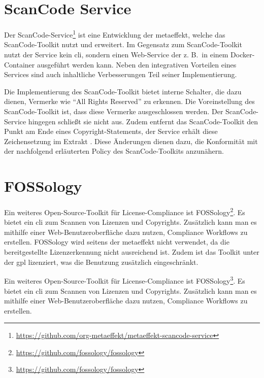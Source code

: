 \section{ScanCode Service}\label{sec:scancode-service}

Der ScanCode-Service\footnote{\url{https://github.com/org-metaeffekt/metaeffekt-scancode-service}} ist eine Entwicklung der metaeffekt, welche das ScanCode-Toolkit nutzt und erweitert.
Im Gegensatz zum ScanCode-Toolkit nutzt der Service kein \gls{cli}, sondern einen Web-Service der z. B.\ in einem Docker-Container ausgeführt werden kann.
Neben den integrativen Vorteilen eines Services sind auch inhaltliche Verbesserungen Teil seiner Implementierung.

Die Implementierung des ScanCode-Toolkit bietet interne Schalter, die dazu dienen, Vermerke wie \enquote{All Rights Reserved} zu erkennen.
Die Voreinstellung des ScanCode-Toolkit ist, dass diese Vermerke ausgeschlossen werden.
Der ScanCode-Service hingegen schließt sie nicht aus.
Zudem entfernt das ScanCode-Toolkit den Punkt am Ende eines Copyright-Statements, der Service erhält diese Zeichensetzung im Extrakt \autocite{noauthor_metaeffekt-scancode-service_2025}.
Diese Änderungen dienen dazu, die Konformität mit der nachfolgend erläuterten Policy des ScanCode-Toolkits anzunähern.


\section{FOSSology}\label{sec:fossology}

Ein weiteres Open-Source-Toolkit für License-Compliance ist FOSSology\footnote{\url{https://github.com/fossology/fossology}}.
Es bietet ein \gls{cli} zum Scannen von Lizenzen und Copyrights.
Zusätzlich kann man es mithilfe einer Web-Benutzeroberfläche dazu nutzen, Compliance Workflows zu erstellen.
FOSSology wird seitens der metaeffekt nicht verwendet, da die bereitgestellte Lizenzerkennung nicht ausreichend ist.
Zudem ist das Toolkit unter der \gls{gpl} lizenziert, was die Benutzung zusätzlich eingeschränkt.

Ein weiteres Open-Source-Toolkit für License-Compliance ist FOSSology\footnote{\url{https://github.com/fossology/fossology}}.
Es bietet ein \gls{cli} zum Scannen von Lizenzen und Copyrights.
Zusätzlich kann man es mithilfe einer Web-Benutzeroberfläche dazu nutzen, Compliance Workflows zu erstellen.

